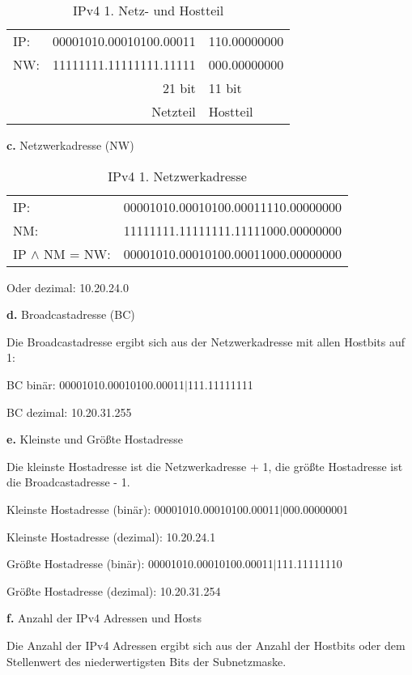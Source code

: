 \begin{table}
    [H]
    \centering
    \begin{tabular}{lr|l}
        IP: & 00001010.00010100.00011 & 110.00000000 \\
        NW: & 11111111.11111111.11111 & 000.00000000 \\
            & 21 bit                  & 11 bit       \\
            & Netzteil                & Hostteil     \\
    \end{tabular}
    \caption{IPv4 1. Netz- und Hostteil}
\end{table}

\textbf{c.} Netzwerkadresse (NW)

\begin{table}
    [H]
    \centering
    \begin{tabular}{ll}
        IP:                 & 00001010.00010100.00011110.00000000 \\
        NM:                 & 11111111.11111111.11111000.00000000 \\
        IP $\land$ NM = NW: & 00001010.00010100.00011000.00000000 \\
    \end{tabular}
    \caption{IPv4 1. Netzwerkadresse}
\end{table}

Oder dezimal: 10.20.24.0

\textbf{d.} Broadcastadresse (BC)

Die Broadcastadresse ergibt sich aus der Netzwerkadresse mit allen Hostbits auf 1:

BC binär: 00001010.00010100.00011$|$111.11111111

BC dezimal: 10.20.31.255

\textbf{e.} Kleinste und Größte Hostadresse

Die kleinste Hostadresse ist die Netzwerkadresse + 1, die größte Hostadresse ist die Broadcastadresse - 1.

Kleinste Hostadresse (binär): 00001010.00010100.00011$|$000.00000001

Kleinste Hostadresse (dezimal): 10.20.24.1

Größte Hostadresse (binär): 00001010.00010100.00011$|$111.11111110

Größte Hostadresse (dezimal): 10.20.31.254

\textbf{f.} Anzahl der IPv4 Adressen und Hosts

Die Anzahl der IPv4 Adressen ergibt sich aus der Anzahl der Hostbits oder dem Stellenwert des niederwertigsten Bits der Subnetzmaske.

